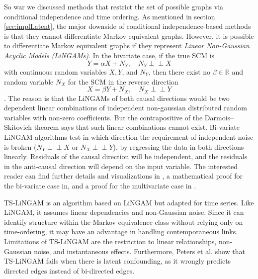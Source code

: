 \documentclass[conference]{IEEEtran}
\begin{document}
So war we discussed methods that restrict the set of possible graphs via conditional independence and time ordering. As mentioned in section \ref{sec:implLatent}, the major downside of conditional independence-based methods is that they cannot differentiate Markov equivalent graphs. 
However, it is possible to differentiate Markov equivalent graphs if they represent \textit{Linear Non-Gaussian Acyclic Models (LiNGAMs)}.
In the bivariate case, if the true SCM is 
\begin{equation}
Y=\alpha X+N_{Y}, \quad N_{Y} \!\perp\!\!\!\perp X
\end{equation}
with continuous random variables $X, Y$, and $N_Y$, then there exist no $\beta\in\mathbb{R}$ and random variable $N_X$ for the SCM in the reverse direction
\begin{equation}
X=\beta Y+N_{X}, \quad N_{X} \!\perp\!\!\!\perp Y
\end{equation}\cite[p.~48]{peters_elements_2018}.
The reason is that the LiNGAMs of both causal directions would be two dependent linear combinations of independent non-gaussian distributed random variables with non-zero coefficients. But the contrapositive of the Darmois–Skitovich theorem\cite{skitovich_linear_1954} says that such linear combinations cannot exist.
Bi-variate LiNGAM algorithms test in which direction the requirement of independent noise is broken ($N_{Y} \!\perp\!\!\!\perp X$ or $N_{X} \!\perp\!\!\!\perp Y$), by regressing the data in both directions linearly. Residuals of the causal direction will be independent, and the residuals in the anti-causal direction will depend on the input variable. 
The interested reader can find further details and visualizations in \cite[p. ~108]{neal_introduction_2020}, a mathematical proof for the bi-variate case in\cite[Appendix C.1]{peters_elements_2018}, and a proof for the multivariate case in \cite{shimizu_linear_2006}.

TS-LiNGAM is an algorithm based on LiNGAM but adapted for time series\cite{hyvarinen_causal_2008}. Like LiNGAM, it assumes linear dependencies and non-Gaussian noise. Since it can identify structure within the Markov equivalence class without relying only on time-ordering, it may have an advantage in handling contemporaneous links.
Limitations of TS-LiNGAM are the restriction to linear relationships, non-Gaussian noise, and instantaneous effects\cite{peters_causal_2013}. Furthermore, Peters et al. show that TS-LiNGAM fails when there is latent confounding, as it wrongly predicts directed edges instead of bi-directed edges\cite{peters_causal_2013}.
\end{document}
